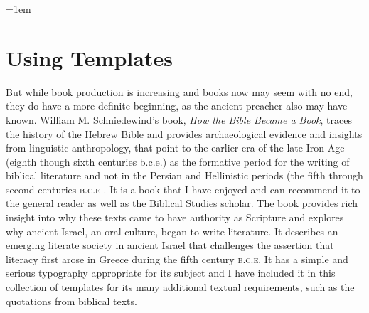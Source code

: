\def\@seccntformat#1{}
\renewsubsection

\makeatother


\lorem

\parindent=1em
\pagestyle{centerheadings}
\captionsetup{labelfont=bf, textfont=bf, justification=centering, width=0.8\textwidth, labelsep=period}


\chapter{Using Templates}


But while book production is increasing and books now may seem with no end, they do have a more definite beginning, as the ancient preacher also may have known. William M. Schniedewind’s book, \emph{How the Bible Became a Book}, traces the history of the Hebrew Bible and provides archaeological evidence and insights from linguistic anthropology,
that point to the earlier era of the late Iron Age (eighth
though sixth centuries b.c.e.) as the formative period for the writing
of biblical literature and not in the Persian and Hellinistic periods (the fifth through second centuries \textsc{b.c.e} 
\citep{schniedewind2005}. It is a book that I have enjoyed and can recommend it to the general reader as well as the Biblical Studies scholar. The book  provides rich insight into why these
texts came to have authority as Scripture and explores why ancient
Israel, an oral culture, began to write literature. It describes an emerging
literate society in ancient Israel that challenges the assertion that
literacy first arose in Greece during the fifth century \textsc{b.c.e.} It has a simple and serious
typography appropriate for its subject and I have included it in this collection of templates for its many additional textual requirements, such as the quotations from biblical texts.

